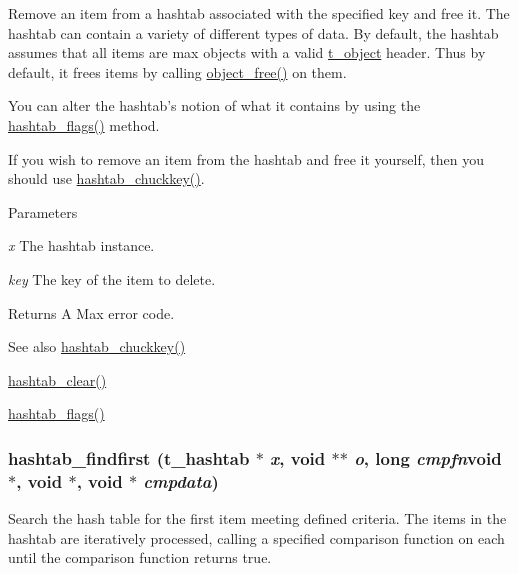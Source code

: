 Remove an item from a hashtab associated with the specified key and free it. The hashtab can contain a variety of different types of data. By default, the hashtab assumes that all items are max objects with a valid \hyperlink{structt__object}{t\_\-object} header. Thus by default, it frees items by calling \hyperlink{group__obj_ga3759846cb356195532c41e35b87522ee}{object\_\-free()} on them.

You can alter the hashtab's notion of what it contains by using the \hyperlink{group__hashtab_gaaaefb350afdfdbe1440dd6401ac56eb7}{hashtab\_\-flags()} method.

If you wish to remove an item from the hashtab and free it yourself, then you should use \hyperlink{group__hashtab_ga9bbf0199ef8b92a977b3bee5fd746799}{hashtab\_\-chuckkey()}.


\begin{DoxyParams}{Parameters}
\item[{\em x}]The hashtab instance. \item[{\em key}]The key of the item to delete. \end{DoxyParams}
\begin{DoxyReturn}{Returns}
A Max error code.
\end{DoxyReturn}
\begin{DoxySeeAlso}{See also}
\hyperlink{group__hashtab_ga9bbf0199ef8b92a977b3bee5fd746799}{hashtab\_\-chuckkey()} 

\hyperlink{group__hashtab_gae7984db2865416d6da6ce20c76975321}{hashtab\_\-clear()} 

\hyperlink{group__hashtab_gaaaefb350afdfdbe1440dd6401ac56eb7}{hashtab\_\-flags()} 
\end{DoxySeeAlso}
\hypertarget{group__hashtab_gadc142f0a2a64417bb8b8d3c2959924fd}{
\subsubsection[{hashtab\_\-findfirst}]{ hashtab\_\-findfirst ({\bf t\_\-hashtab} $\ast$ {\em x}, \/  void $\ast$$\ast$ {\em o}, \/  long  {\em cmpfn}void $\ast$, void $\ast$, \/  void $\ast$ {\em cmpdata})}}
\label{group__hashtab_gadc142f0a2a64417bb8b8d3c2959924fd}


Search the hash table for the first item meeting defined criteria. The items in the hashtab are iteratively processed, calling a specified comparison function on each until the comparison function returns true.



